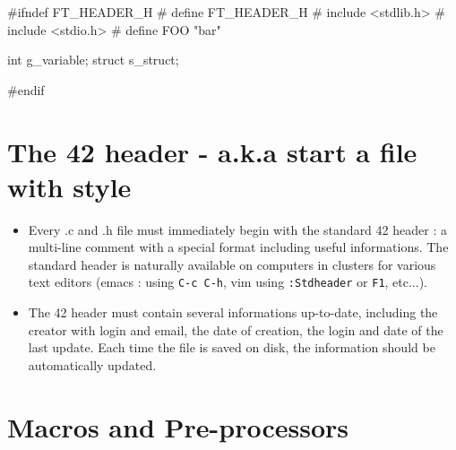 \documentclass{42-ko}
\begin{document}
        \begin{42ccode}
#ifndef FT_HEADER_H
# define FT_HEADER_H
# include <stdlib.h>
# include <stdio.h>
# define FOO "bar"

int		g_variable;
struct	s_struct;

#endif
        \end{42ccode}
        \newpage



   \section{The 42 header - a.k.a start a file with style}

        \begin{itemize}

        \item Every .c and .h file must immediately begin with the standard 42 header :
          a multi-line comment with a special format including useful informations. The
          standard header is naturally available on computers in clusters for various
          text editors (emacs : using \texttt{C-c C-h}, vim using \texttt{:Stdheader} or
          \texttt{F1}, etc...).

        \item The 42 header must contain several informations up-to-date, including the
          creator with login and email, the date of creation, the login and date of the
          last update. Each time the file is saved on disk, the information should be
          automatically updated.

        \end{itemize}
        \newpage


    \section{Macros and Pre-processors}
\end{document}
